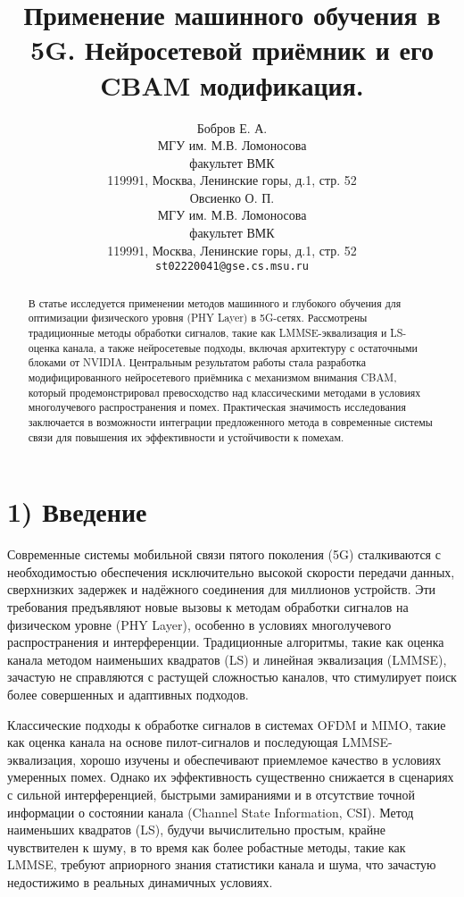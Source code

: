 \documentclass{article}
\title{Применение машинного обучения в 5G. Нейросетевой приёмник и его CBAM модификация.}
\author{Бобров Е. А.\\
	МГУ им. М.В. Ломоносова\\
	факультет ВМК\\
        119991, Москва, Ленинские горы, д.1, стр. 52\\
        \And
        Овсиенко О. П. \\
	МГУ им. М.В. Ломоносова\\
	факультет ВМК\\
        119991, Москва, Ленинские горы, д.1, стр. 52\\
	\texttt{st02220041@gse.cs.msu.ru} \\
}
\date{}
\begin{document}
\maketitle

\begin{abstract}
В статье исследуется применении методов машинного и глубокого обучения для оптимизации физического уровня (PHY Layer) в 5G-сетях. Рассмотрены традиционные методы обработки сигналов, такие как LMMSE-эквализация и LS-оценка канала, а также нейросетевые подходы, включая архитектуру с остаточными блоками от NVIDIA. Центральным результатом работы стала разработка модифицированного нейросетевого приёмника с механизмом внимания CBAM, который продемонстрировал превосходство над классическими методами в условиях многолучевого распространения и помех. Практическая значимость исследования заключается в возможности интеграции предложенного метода в современные системы связи для повышения их эффективности и устойчивости к помехам.
\end{abstract}


\section*{1) Введение}

Современные системы мобильной связи пятого поколения (5G) сталкиваются с необходимостью обеспечения исключительно высокой скорости передачи данных, сверхнизких задержек и надёжного соединения для миллионов устройств. Эти требования предъявляют новые вызовы к методам обработки сигналов на физическом уровне (PHY Layer), особенно в условиях многолучевого распространения и интерференции. Традиционные алгоритмы, такие как оценка канала методом наименьших квадратов (LS) и линейная эквализация (LMMSE), зачастую не справляются с растущей сложностью каналов, что стимулирует поиск более совершенных и адаптивных подходов.

Классические подходы к обработке сигналов в системах OFDM и MIMO, такие как оценка канала на основе пилот-сигналов и последующая LMMSE-эквализация, хорошо изучены и обеспечивают приемлемое качество в условиях умеренных помех. Однако их эффективность существенно снижается в сценариях с сильной интерференцией, быстрыми замираниями и в отсутствие точной информации о состоянии канала (Channel State Information, CSI). Метод наименьших квадратов (LS), будучи вычислительно простым, крайне чувствителен к шуму, в то время как более робастные методы, такие как LMMSE, требуют априорного знания статистики канала и шума, что зачастую недостижимо в реальных динамичных условиях.
\end{document}
